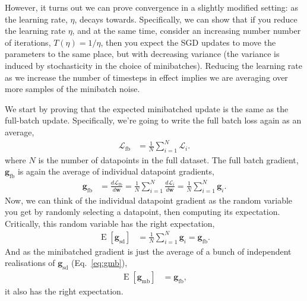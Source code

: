\documentclass{article}
\newcommand{\dt}[2][]{\frac{d #1}{d #2}}
\newcommand{\dLi}{\dt[{\Li}]}
\newcommand{\dLfb}{\dt[{\Lfb}]}
\newcommand{\bracket}[3]{\left#1 #3 \right#2}
\newcommand{\sqb}{\bracket{[}{]}}
\newcommand{\0}{\mathbf{0}}
\newcommand{\g}{\mathbf{g}}
\newcommand{\gfb}{\g_\text{fb}}
\newcommand{\gmb}{\g_\text{mb}}
\newcommand{\gsd}{\g_\text{sd}}
\newcommand{\w}{\mathbf{w}}
\renewcommand{\L}{\mathcal{L}}
\newcommand{\Li}{\L_i}
\newcommand{\Lfb}{\L_\text{fb}}
\newcommand{\E}{\operatorname{E}\sqb}
\newcommand{\fbsize}{N}
\newcommand{\fbavg}{\tfrac{1}{\fbsize} \sum_{i=1}^{\fbsize}}
\begin{document}
However, it turns out we can prove convergence in a slightly modified setting: as the learning rate, $\eta$, decays towards.
Specifically, we can show that if you reduce the learning rate $\eta$, and at the same time, consider an increasing number number of iterations, $T(\eta) = 1/\eta$, then you expect the SGD updates to move the parameters to the same place, but with decreasing variance (the variance is induced by stochasticity in the choice of minibatches). 
Reducing the learning rate as we increase the number of timesteps in effect implies we are averaging over more samples of the minibatch noise.

We start by proving that the expected minibatched update is the same as the full-batch update.
Specifically, we're going to write the full batch loss again as an average,
\begin{align}
  \Lfb &= \fbavg \Li.
\end{align}
where $N$ is the number of datapoints in the full dataset.
The full batch gradient, $\gfb$ is again the average of individual datapoint gradients,
\begin{align}
  \gfb &= \dLfb{\w} = \fbavg \dLi{\w} = \fbavg \g_i.
\end{align}
Now, we can think of the individual datapoint gradient as the random variable you get by randomly selecting a datapoint, then computing its expectation.
Critically, this random variable has the right expectation,
\begin{align}
  \E{\gsd} &= \fbavg \g_i = \gfb.
\end{align}
And as the minibatched gradient is just the average of a bunch of independent realisations of $\gsd$ (Eq.~\ref{eq:gmb}),
\begin{align}
  \E{\gmb} &= \gfb,
\end{align}
it also has the right expectation.
\end{document}
